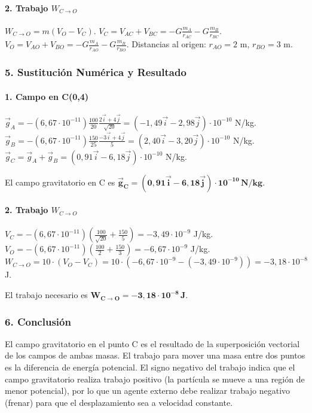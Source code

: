 \paragraph{2. Trabajo $W_{C \to O}$}
$W_{C \to O} = m(V_O - V_C)$.
$V_C = V_{AC} + V_{BC} = -G\frac{m_A}{r_{AC}} - G\frac{m_B}{r_{BC}}$.
$V_O = V_{AO} + V_{BO} = -G\frac{m_A}{r_{AO}} - G\frac{m_B}{r_{BO}}$.
Distancias al origen: $r_{AO} = 2$ m, $r_{BO} = 3$ m.

\subsubsection*{5. Sustitución Numérica y Resultado}
\paragraph{1. Campo en C(0,4)}
$\vec{g}_A = -(6,67\cdot 10^{-11})\frac{100}{20} \frac{2\vec{i}+4\vec{j}}{\sqrt{20}} = (-1,49\vec{i} - 2,98\vec{j})\cdot 10^{-10}$ N/kg.
$\vec{g}_B = -(6,67\cdot 10^{-11})\frac{150}{25} \frac{-3\vec{i}+4\vec{j}}{5} = (2,40\vec{i} - 3,20\vec{j})\cdot 10^{-10}$ N/kg.
$\vec{g}_C = \vec{g}_A + \vec{g}_B = (0,91\vec{i} - 6,18\vec{j})\cdot 10^{-10}$ N/kg.
\begin{cajaresultado}
    El campo gravitatorio en C es $\boldsymbol{\vec{g}_C = (0,91\vec{i} - 6,18\vec{j}) \cdot 10^{-10} \, \textbf{N/kg}}$.
\end{cajaresultado}

\paragraph{2. Trabajo $W_{C \to O}$}
$V_C = -(6,67\cdot 10^{-11})\left(\frac{100}{\sqrt{20}} + \frac{150}{5}\right) = -3,49 \cdot 10^{-9}$ J/kg.
$V_O = -(6,67\cdot 10^{-11})\left(\frac{100}{2} + \frac{150}{3}\right) = -6,67 \cdot 10^{-9}$ J/kg.
$W_{C \to O} = 10 \cdot (V_O - V_C) = 10 \cdot (-6,67\cdot 10^{-9} - (-3,49\cdot 10^{-9})) = -3,18 \cdot 10^{-8}$ J.
\begin{cajaresultado}
    El trabajo necesario es $\boldsymbol{W_{C \to O} = -3,18 \cdot 10^{-8} \, \textbf{J}}$.
\end{cajaresultado}

\subsubsection*{6. Conclusión}
\begin{cajaconclusion}
El campo gravitatorio en el punto C es el resultado de la superposición vectorial de los campos de ambas masas. El trabajo para mover una masa entre dos puntos es la diferencia de energía potencial. El signo negativo del trabajo indica que el campo gravitatorio realiza trabajo positivo (la partícula se mueve a una región de menor potencial), por lo que un agente externo debe realizar trabajo negativo (frenar) para que el desplazamiento sea a velocidad constante.
\end{cajaconclusion}

